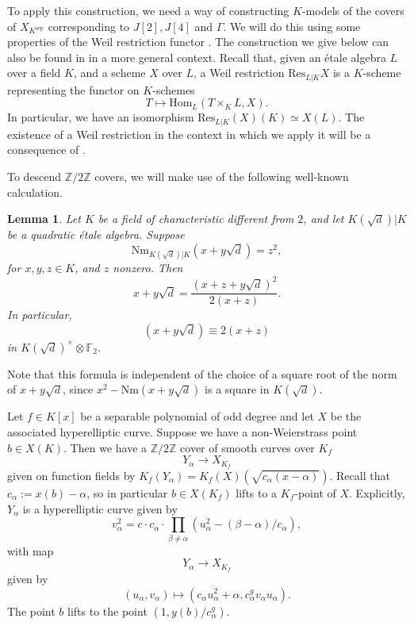 \documentclass[11pt]{amsart}
\def\F{\mathbb F}
\theoremstyle{plain}
\newtheorem{lemma}{Lemma}
\theoremstyle{definition}
\newcommand{\sep}{\mathrm{sep}}
\newcommand{\Nm}{\mathrm{Nm}}
\newcommand{\Res}{\mathrm{Res}}
\newcommand{\Hom}{\mathrm{Hom}}
\begin{document}
To apply this construction, we need a way of constructing $K$-models of the covers of $X_{K^{\sep }}$ corresponding to $J[2],J[4]$ and $\Gamma$. We will do this using some properties of the Weil restriction functor \cite[7.6]{BLR}. The construction we give below can also be found in \cite[\S 5]{stoll:descent} in a more general context. Recall that, given an \'etale algebra $L$ over a field $K$, and a scheme $X$ over $L$, a Weil restriction $\Res _{L|K}X$ is a $K$-scheme representing the functor on $K$-schemes
\[
T\mapsto \Hom _L (T\times _K L,X).
\]
In particular, we have an isomorphism $\Res _{L|K}(X)(K)\simeq X(L)$. The existence of a Weil restriction in the context in which we apply it will be a consequence of \cite[Theorem 7.6.4]{BLR}.

To descend $\mathbb{Z}/2\mathbb{Z}$ covers, we will make use of the following well-known calculation.
\begin{lemma}\label{lemma:sqrt_nm}
Let $K$ be a field of characteristic different from $2$, and let $K(\sqrt{d})|K$ be a quadratic \'etale algebra. Suppose 
\[
\Nm _{K(\sqrt{d})|K}(x+y\sqrt{d})=z^2 ,
\]
for $x,y,z\in K$, and $z$ nonzero. Then 
\[
x+y\sqrt{d}=\frac{(x+z+y\sqrt{d})^2}{2(x+z)}.
\]
In particular,
\[
(x+y\sqrt{d})\equiv 2(x+z)
\]
in $K(\sqrt{d})^\times \otimes \F _2 $.
\end{lemma}
Note that this formula is independent of the choice of a square root of the norm of $x+y\sqrt{d}$, since $x^2 -\Nm (x+y\sqrt{d})$ is a square in $K(\sqrt{d})$.


Let $f\in K[x]$ be a separable polynomial of odd degree and let $X$ be the associated hyperelliptic curve. Suppose we have a non-Weierstrass point $b\in X(K)$. Then we have a $\mathbb{Z}/2\mathbb{Z}$ cover of smooth curves over $K_f $
\begin{equation}\label{eqn:Yalpha}
Y_{\alpha }\to X_{K_f }
\end{equation}
given on function fields by $K_f (Y_{\alpha })=K_f (X)(\sqrt{c_{\alpha }(x-\alpha )})$. Recall that $c_{\alpha }:=x(b)-\alpha $, so in particular $b\in X(K_f )$ lifts to a $K_f $-point of $X$. Explicitly, $Y_{\alpha }$ is a hyperelliptic curve given by
\[
v_{\alpha }^2 =c\cdot c_{\alpha }\cdot \prod _{\beta \neq \alpha }(u_{\alpha }^2 -(\beta -\alpha )/c_{\alpha }),
\]
with map
\[
Y_{\alpha }\to X_{K_f}
\]
given by 
\[
(u_{\alpha } ,v_{\alpha })\mapsto (c_{\alpha }u_{\alpha }^2 +\alpha ,c_{\alpha }^g v_{\alpha }u_{\alpha }).
\]
The point $b$ lifts to the point $(1,y(b)/c_\alpha ^g )$.
\end{document}
